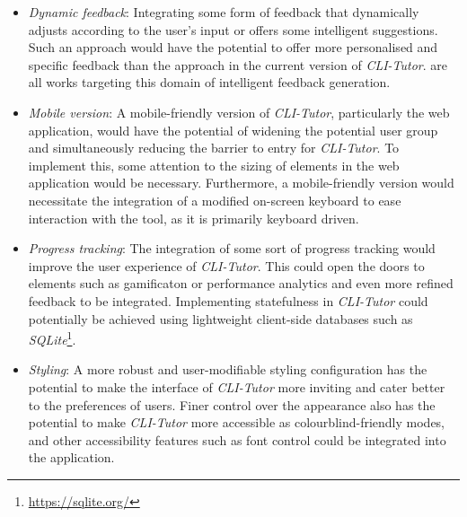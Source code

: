 \begin{itemize}

	\item  \textit{Dynamic feedback}: Integrating some form of feedback that
	      dynamically adjusts according to the user's input or offers some
	      intelligent suggestions. Such an approach would have the potential to
	      offer more personalised and specific feedback than the approach in the
	      current version of \textit{CLI-Tutor}. \cite{keuning2014strategy,
		      gerdes2017ask, rivers2017data} are all works targeting this domain of
	      intelligent feedback generation.

	\item \textit{Mobile version}: A mobile-friendly version of
	      \textit{CLI-Tutor}, particularly the web application, would have the
	      potential of widening the potential user group and simultaneously
	      reducing the barrier to entry for \textit{CLI-Tutor}. To
	      implement this, some attention to the sizing of elements in the web
	      application would be necessary. Furthermore, a mobile-friendly
	      version would necessitate the integration of a modified on-screen
	      keyboard to ease interaction with the tool, as it is primarily
	      keyboard driven.

	\item \textit{Progress tracking}: The integration of some sort of
	      progress tracking would improve the user experience of
	      \textit{CLI-Tutor}. This could open the doors to elements such as
	      gamificaton or performance analytics and even more refined feedback
	      to be integrated. Implementing statefulness in \textit{CLI-Tutor}
	      could potentially be achieved using lightweight client-side databases
	      such as \textit{SQLite}\footnote{\url{https://sqlite.org/}}.

      \item \textit{Styling}: A more robust and user-modifiable styling
          configuration has the potential to make the interface of
          \textit{CLI-Tutor} more inviting and cater better to the preferences
          of users. Finer control over the appearance also has the potential
          to make \textit{CLI-Tutor} more accessible as colourblind-friendly
          modes, and other accessibility features such as font control could be
          integrated into the application. 

\end{itemize}


